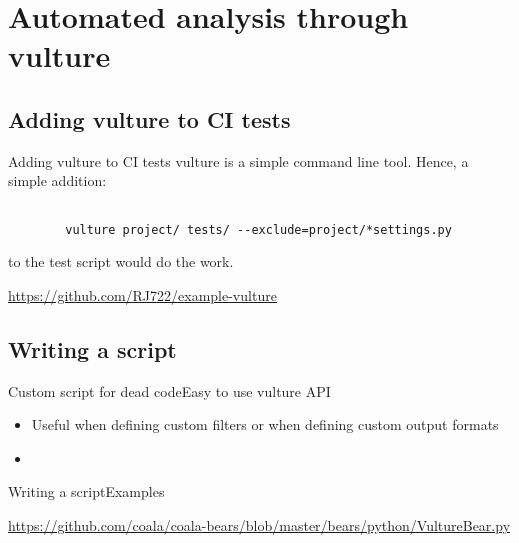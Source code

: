 \documentclass{beamer}
\begin{document}
\section{Automated analysis through vulture}

\subsection{Adding vulture to CI tests}

\begin{frame}{Adding vulture to CI tests}
    vulture is a simple command line tool.
    Hence, a simple addition:

    \begin{verbatim}

        vulture project/ tests/ --exclude=project/*settings.py

    \end{verbatim}

    to the test script would do the work.

    \begin{example}
        \url{https://github.com/RJ722/example-vulture}
    \end{example}

\end{frame}

\subsection{Writing a script}

\begin{frame}{Custom script for dead code}{Easy to use vulture API}
    \begin{itemize}
        \item Useful when defining custom filters \pause or when defining custom output formats
        \pause
        \item \inputminted{python}{content/custom_script.py}
    \end{itemize}
\end{frame}

\begin{frame}{Writing a script}{Examples}
    \begin{example}
        \url{https://github.com/coala/coala-bears/blob/master/bears/python/VultureBear.py}
    \end{example}

\end{frame}
\end{document}
